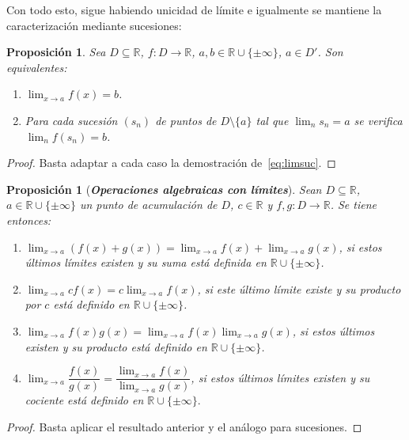 \documentclass[12pt]{article}
\newtheorem{proposition}[theorem]{Proposición}
\begin{document}
Con todo esto, sigue habiendo unicidad de límite e igualmente se mantiene la caracterización mediante sucesiones: 
\begin{proposition}\label{eq:maslimsuc} Sea $D \subseteq \mathbb{R}$, $f \colon D \longrightarrow \mathbb{R}$, $a,b \in \mathbb{R} \cup \lbrace \pm \infty \rbrace$, $a \in D'$. Son equivalentes: 
\begin{enumerate}
\item $\lim_{x \rightarrow a} f(x) = b$.
\item Para cada sucesión $(s_n)$ de puntos de $D \setminus \lbrace a \rbrace$ tal que $\lim_n s_n = a$ se verifica $\lim_n f(s_n) = b$.
\end{enumerate}
\end{proposition}
\begin{proof}
Basta adaptar a cada caso la demostración de~\ref{eq:limsuc}.
\end{proof}

\begin{proposition}[\textbf{\textit{Operaciones algebraicas con límites}}] Sean $D \subseteq \mathbb{R}$, $a \in \mathbb{R} \cup \lbrace \pm \infty \rbrace$ un punto de acumulación de $D$, $c \in \mathbb{R}$ y $f,g \colon D \longrightarrow \mathbb{R}$. Se tiene entonces: 
\begin{enumerate}
\item $\lim_{x \rightarrow a } (f(x) + g(x)) = \lim_{x \rightarrow a} f(x) + \lim_{x \rightarrow a} g(x)$, si estos últimos límites existen y su suma está definida en $\mathbb{R} \cup \lbrace \pm \infty \rbrace$.
\item $\lim_{x \rightarrow a} cf(x) = c \lim_{x \rightarrow a} f(x)$, si este último límite existe y su producto por $c$ está definido en $\mathbb{R} \cup \lbrace \pm \infty	 \rbrace$.
\item $\lim_{x \rightarrow a} f(x)g(x) = \lim_{x \rightarrow a} f(x) \lim_{x \rightarrow a} g(x)$, si estos últimos existen y su producto está definido en $\mathbb{R} \cup \lbrace \pm \infty	\rbrace$. 
\item $\lim_{x \rightarrow a} \dfrac{f(x)}{g(x)} = \dfrac{\lim_{x \rightarrow a} f(x)}{\lim_{x \rightarrow a}g(x)}$, si estos últimos límites existen y su cociente está definido en $\mathbb{R} \cup \lbrace \pm \infty \rbrace.$
\end{enumerate}
\end{proposition}
\begin{proof}
Basta aplicar el resultado anterior y el análogo para sucesiones.

\end{proof}
\end{document}
